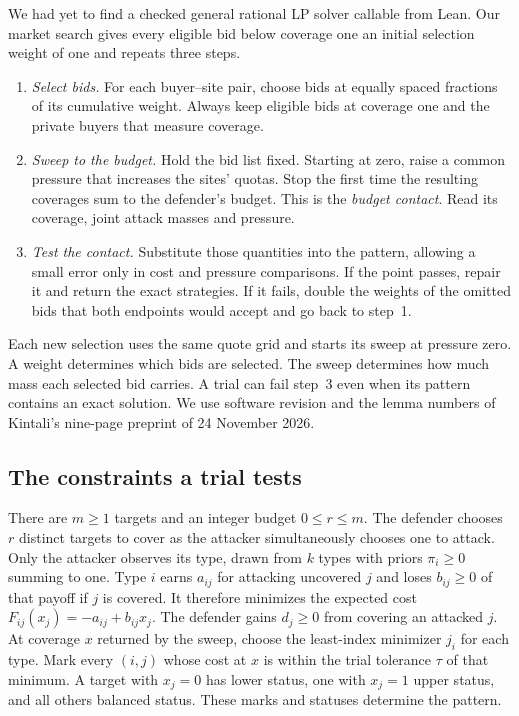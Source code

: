 \documentclass[11pt,letterpaper]{article}
\newcommand{\code}[1]{\textnormal{\texttt{\detokenize{#1}}}}
\begin{document}
We had yet to find a checked general rational LP solver callable from Lean.
Our market search gives every eligible bid below coverage one an initial
selection weight of one and repeats three steps.
\begin{enumerate}
\setlength{\itemsep}{.15\baselineskip}
\setlength{\parsep}{0pt}
\item \emph{Select bids.} For each buyer--site pair, choose bids at equally
spaced fractions of its cumulative weight. Always keep eligible bids at
coverage one and the private buyers that measure coverage.
\item \emph{Sweep to the budget.} Hold the bid list fixed. Starting at zero,
raise a common pressure that increases the sites' quotas. Stop the first
time the resulting coverages sum to the defender's budget. This is the
\emph{budget contact}. Read its coverage, joint attack masses and pressure.
\item \emph{Test the contact.} Substitute those quantities into the pattern,
allowing a small error only in cost and pressure comparisons. If the point
passes, repair it and return the exact strategies. If it fails, double
the weights of the omitted bids that both endpoints would accept and go
back to step~1.
\end{enumerate}
Each new selection uses the same quote grid and starts its sweep at
pressure zero. A weight determines which bids are selected. The sweep
determines how much mass each selected bid carries. A trial can fail
step~3 even when its pattern contains an exact solution.
We use software revision \code{75bc25c} and the lemma numbers of Kintali's
nine-page preprint of 24 November 2026. \cite{artifact,review,followup,kintali}

\subsection{The constraints a trial tests}
\label{sec:pattern}

There are $m\ge1$ targets and an integer budget $0\le r\le m$. The
defender chooses $r$ distinct targets to cover as the attacker
simultaneously chooses one to attack. Only the attacker observes its type,
drawn from $k$ types with priors $\pi_i\ge0$ summing to one.
Type $i$ earns $a_{ij}$ for attacking uncovered $j$ and loses $b_{ij}\ge0$
of that payoff if $j$ is covered. It therefore minimizes the expected cost
$F_{ij}(x_j)=-a_{ij}+b_{ij}x_j$. The defender gains $d_j\ge0$ from covering
an attacked $j$. At coverage $x$ returned by the sweep, choose the least-index
minimizer $j_i$ for each type. Mark every $(i,j)$ whose cost at $x$ is
within the trial tolerance $\tau$ of that minimum. A target with $x_j=0$
has lower status, one with $x_j=1$ upper status, and all others balanced
status. These marks and statuses determine the pattern. \cite[\S\S1,3]{kintali}
\end{document}
